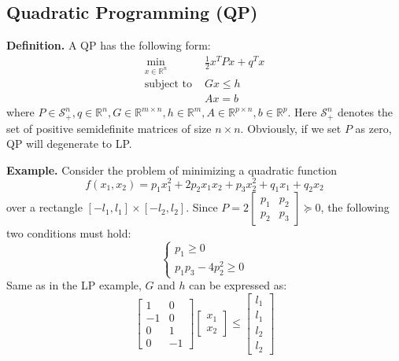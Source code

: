 \documentclass[
]{book}
\theoremstyle{definition}
\theoremstyle{definition}
\theoremstyle{definition}
\theoremstyle{definition}
\theoremstyle{remark}
\begin{document}
\subsection{Quadratic Programming (QP)}\label{quadratic-programming-qp}

\textbf{Definition.} A QP has the following form:
\begin{align}
   \label{eq:app-qpdef}
   \min_{x \in \mathbb{R}^n} \ & \frac{1}{2} x^T P x + q^T x \\
   \text{subject to } & Gx \le h \\
   & Ax = b
\end{align}
where \(P \in \mathcal{S}_+^n, q\in \mathbb{R}^n, G \in \mathbb{R}^{m \times n}, h\in \mathbb{R}^m, A \in \mathbb{R}^{p \times n}, b \in \mathbb{R}^p\). Here \(\mathcal{S}_+^n\) denotes the set of positive semidefinite matrices of size \(n\times n\). Obviously, if we set \(P\) as zero, QP will degenerate to LP.

\textbf{Example.} Consider the problem of minimizing a quadratic function
\begin{equation*}
   f(x_1, x_2) = p_1 x_1^2 + 2p_2 x_1 x_2 + p_3 x_2^2 + q_1 x_1 + q_2 x_2
\end{equation*}
over a rectangle \([-l_1, l_1] \times [-l_2, l_2]\). Since \(P = 2 \begin{bmatrix}
   p_1 & p_2 \\ p_2 & p_3
\end{bmatrix} \succeq 0\), the following two conditions must hold:
\begin{equation*}
   \begin{cases}
      p_1 \ge 0 \\
      p_1 p_3 - 4 p_2^2 \ge 0
   \end{cases}
\end{equation*}
Same as in the LP example, \(G\) and \(h\) can be expressed as:
\begin{equation*}
   \begin{bmatrix}
      1 & 0 \\ -1 & 0 \\ 0 & 1 \\ 0 & -1
   \end{bmatrix} \begin{bmatrix}
      x_1 \\ x_2
   \end{bmatrix} \le \begin{bmatrix}
      l_1 \\ l_1 \\ l_2 \\ l_2
   \end{bmatrix}
\end{equation*}
\end{document}
